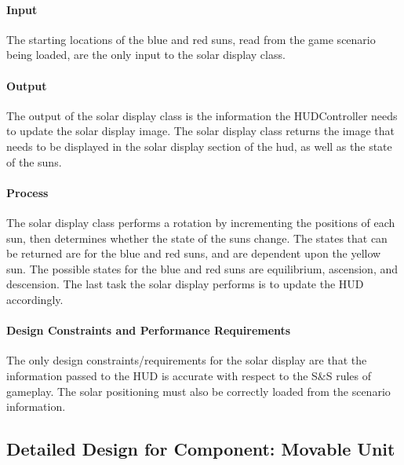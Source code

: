 \documentclass[12pt,a4paper,titlepage]{article}
\begin{document}
\paragraph{Input} The starting locations of the blue and red suns, read from the game scenario being loaded, are the only input to the solar display class.
\paragraph{Output} The output of the solar display class is the information the HUDController needs to update the solar display image. The solar display class returns the image that needs to be displayed in the solar display section of the hud, as well as the state of the suns.
\paragraph{Process} The solar display class performs a rotation by incrementing the positions of each sun, then determines whether the state of the suns change. The states that can be returned are for the blue and red suns, and are dependent upon the yellow sun. The possible states for the blue and red suns are equilibrium, ascension, and descension. The last task the solar display performs is to update the HUD accordingly. 
\paragraph{Design Constraints and Performance Requirements} The only design constraints/requirements for the solar display are that the information passed to the HUD is accurate with respect to the S\&S rules of gameplay. The solar positioning must also be correctly loaded from the scenario information. 

\subsection{Detailed Design for Component: Movable Unit}
\end{document}
